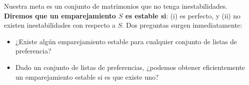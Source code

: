 \documentclass[a4paper, 12pt]{book}
\theoremstyle{dotless}
\begin{document}
Nuestra meta es un conjunto de matrimonios que no tenga inestabilidades. \textbf{Diremos que un emparejamiento $S$ es estable si}: (i) es perfecto, y (ii) no existen inestabilidades con respecto a $S$. Dos preguntas surgen inmediatamente:

\begin{itemize}
    \item ¿Existe algún emparejamiento estable para cualquier conjunto de listas de preferencia?
    \item Dado un conjunto de listas de preferencias, ¿podemos obtener eficientemente un emparejamiento estable si es que existe uno? 
\end{itemize}


\end{document}
